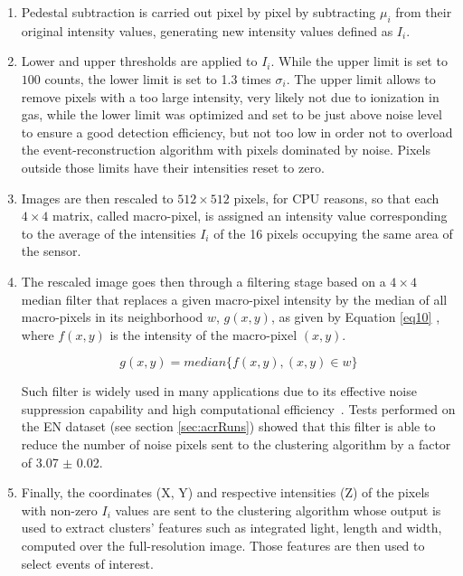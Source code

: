 \documentclass[a4paper,11pt]{article}
\begin{document}
\begin{enumerate}
\addtocounter{enumi}{0}
    
    \item Pedestal subtraction is carried out pixel by pixel by subtracting $\mu_i$ from their original intensity values, generating new intensity values defined as $I_i$. 

    \item Lower and upper thresholds are applied to $I_i$.
    While the upper limit is set to $100$ counts, the lower limit is set to 1.3 times $\sigma_i$.
    The upper limit allows to remove pixels with a too large intensity, very likely not due to ionization in gas, while the lower limit was optimized and set to be just above noise level to ensure a good detection efficiency, but not too low in order not to overload the event-reconstruction algorithm with pixels dominated by noise. Pixels outside those limits have their intensities reset to zero.
    
    
    \item Images are then rescaled to $512 \times 512$ pixels, for CPU reasons, so that each $4 \times 4$ matrix, called macro-pixel, is assigned an intensity value corresponding to the average of the intensities $I_i$ of the 16 pixels occupying the same area of the sensor. %
    
    \item The rescaled image goes then through a filtering stage based on a $4 \times 4$ median filter that replaces a given macro-pixel intensity by the median of all macro-pixels in its neighborhood $w$, $g(x,y)$, as given by Equation \ref{eq10} \cite{filterStudy}, where $f(x,y)$ is the intensity of the macro-pixel $(x,y)$.
    
     \begin{equation}
             g(x,y) = median\{f(x,y), (x,y) \in w\}
             \label{eq10}
         \end{equation}
        
    Such filter is widely used in many applications due to its effective noise suppression capability and high computational efficiency~\cite{Dong_2007}.
    Tests performed on the EN dataset (see section \ref{sec:acrRuns}) showed that this filter is able to reduce the number of noise pixels sent to the clustering algorithm by a factor of 3.07 $\pm$ 0.02.
    
    
        
        
  
    
    \item Finally, the coordinates (X, Y) and respective intensities (Z) of the pixels with non-zero $I_i$ values are sent to the clustering algorithm whose output is used to extract clusters' features such as integrated light, length and width, computed over the full-resolution image. Those features are then used to select events of interest. 
\end{enumerate}
\end{document}
